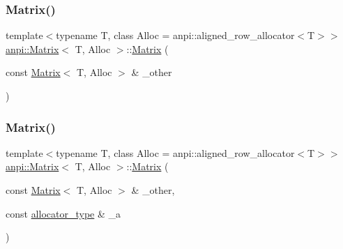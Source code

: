 \mbox{\label{classanpi_1_1Matrix_a8ac1a07fbbf670e4aba4cd24be13795d}} 
\subsubsection{\texorpdfstring{Matrix()}{Matrix()}\hspace{0.1cm}{\footnotesize\ttfamily [9/17]}}
{\footnotesize\ttfamily template$<$typename T, class Alloc = anpi\+::aligned\+\_\+row\+\_\+allocator$<$\+T$>$$>$ \\
\hyperlink{classanpi_1_1Matrix}{anpi\+::\+Matrix}$<$ T, Alloc $>$\+::\hyperlink{classanpi_1_1Matrix}{Matrix} (\begin{DoxyParamCaption}\item[{const \hyperlink{classanpi_1_1Matrix}{Matrix}$<$ T, Alloc $>$ \&}]{\+\_\+other }\end{DoxyParamCaption})}

\mbox{\label{classanpi_1_1Matrix_a0bda39fd27d75c2304d7bf18621c4f52}} 
\subsubsection{\texorpdfstring{Matrix()}{Matrix()}\hspace{0.1cm}{\footnotesize\ttfamily [10/17]}}
{\footnotesize\ttfamily template$<$typename T, class Alloc = anpi\+::aligned\+\_\+row\+\_\+allocator$<$\+T$>$$>$ \\
\hyperlink{classanpi_1_1Matrix}{anpi\+::\+Matrix}$<$ T, Alloc $>$\+::\hyperlink{classanpi_1_1Matrix}{Matrix} (\begin{DoxyParamCaption}\item[{const \hyperlink{classanpi_1_1Matrix}{Matrix}$<$ T, Alloc $>$ \&}]{\+\_\+other,  }\item[{const \hyperlink{classanpi_1_1Matrix_a3574b7528e3ddfb2f7cdf446be8286c1}{allocator\+\_\+type} \&}]{\+\_\+a }\end{DoxyParamCaption})}

\mbox{\label{classanpi_1_1Matrix_a282bae7fdd3631ada20070984dc22464}} 
